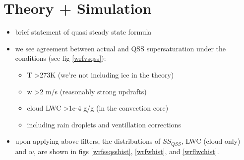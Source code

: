 \documentclass{article}
\begin{document}
\section{Theory + Simulation}
\begin{itemize}
	\item brief statement of quasi steady state formula 
	\item we see agreement between actual and QSS supersaturation under the conditions (see fig \ref{wrfvsqss}):
	\begin{itemize}
		\item T \textgreater  273K (we're not including ice in the theory)
		\item w \textgreater  2 m/s (reasonably strong updrafts)
		\item cloud LWC \textgreater  1e-4 g/g (in the convection core)
		\item including rain droplets and ventillation corrections
	\end{itemize}
	\item upon applying above filters, the distributions of $SS_{QSS}$, LWC (cloud only) and $w$, are shown in figs \ref{wrfssqsshist}, \ref{wrfwhist}, and \ref{wrflwchist}.
\end{itemize}
\end{document}
